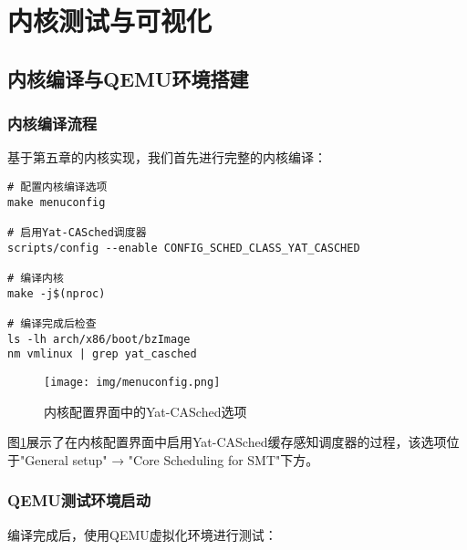 

\section{内核测试与可视化} \label{sec:test}

\subsection{内核编译与QEMU环境搭建}

\subsubsection{内核编译流程}
基于第五章的内核实现，我们首先进行完整的内核编译：
\begin{tcolorbox} [
    enhanced,
    colback=blue!5,
    colframe=blue!40!black,
    leftrule=3mm,
    rightrule=0mm,
    toprule=0mm,
    bottomrule=0mm,
    arc=2mm,
    left=5mm,
    right=5mm,
    top=3mm,
    bottom=3mm,
    fonttitle=\bfseries,
    title=\textbf{内核编译命令}
]
\begin{lstlisting}[basicstyle=\footnotesize\fontfamily{zi4}\selectfont, showstringspaces=false]
# 配置内核编译选项
make menuconfig

# 启用Yat-CASched调度器
scripts/config --enable CONFIG_SCHED_CLASS_YAT_CASCHED

# 编译内核
make -j$(nproc)

# 编译完成后检查
ls -lh arch/x86/boot/bzImage
nm vmlinux | grep yat_casched
\end{lstlisting}
\end{tcolorbox}

\begin{figure}[H]
\centering
\texttt{[image: img/menuconfig.png]}

\caption{内核配置界面中的Yat-CASched选项}
\label{fig:menuconfig}
\end{figure}

图\ref{fig:menuconfig}展示了在内核配置界面中启用Yat-CASched缓存感知调度器的过程，该选项位于"General setup" → "Core Scheduling for SMT"下方。

\subsubsection{QEMU测试环境启动}
编译完成后，使用QEMU虚拟化环境进行测试：

